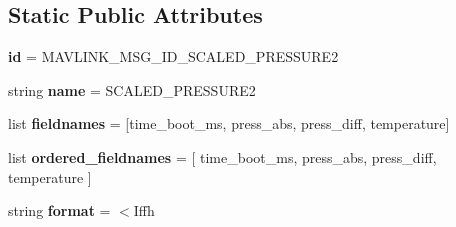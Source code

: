 \subsection*{Static Public Attributes}
\begin{DoxyCompactItemize}
\item 
\mbox{\label{classpymavlink_1_1dialects_1_1v10_1_1MAVLink__scaled__pressure2__message_ac66d91ca3622bdeb282b62afc1de1c6a}} 
{\bfseries id} = M\+A\+V\+L\+I\+N\+K\+\_\+\+M\+S\+G\+\_\+\+I\+D\+\_\+\+S\+C\+A\+L\+E\+D\+\_\+\+P\+R\+E\+S\+S\+U\+R\+E2
\item 
\mbox{\label{classpymavlink_1_1dialects_1_1v10_1_1MAVLink__scaled__pressure2__message_ad426768002b2568831a07eaeb1a36ba4}} 
string {\bfseries name} = \textquotesingle{}S\+C\+A\+L\+E\+D\+\_\+\+P\+R\+E\+S\+S\+U\+R\+E2\textquotesingle{}
\item 
\mbox{\label{classpymavlink_1_1dialects_1_1v10_1_1MAVLink__scaled__pressure2__message_a4ec01c67351e0902a546a796f3b4b1c2}} 
list {\bfseries fieldnames} = \mbox{[}\textquotesingle{}time\+\_\+boot\+\_\+ms\textquotesingle{}, \textquotesingle{}press\+\_\+abs\textquotesingle{}, \textquotesingle{}press\+\_\+diff\textquotesingle{}, \textquotesingle{}temperature\textquotesingle{}\mbox{]}
\item 
\mbox{\label{classpymavlink_1_1dialects_1_1v10_1_1MAVLink__scaled__pressure2__message_a3de88790bff3d565933d9c56fc82ffd2}} 
list {\bfseries ordered\+\_\+fieldnames} = \mbox{[} \textquotesingle{}time\+\_\+boot\+\_\+ms\textquotesingle{}, \textquotesingle{}press\+\_\+abs\textquotesingle{}, \textquotesingle{}press\+\_\+diff\textquotesingle{}, \textquotesingle{}temperature\textquotesingle{} \mbox{]}
\item 
\mbox{\label{classpymavlink_1_1dialects_1_1v10_1_1MAVLink__scaled__pressure2__message_a4602830c5f318293a236cde368227c0c}} 
string {\bfseries format} = \textquotesingle{}$<$Iffh\textquotesingle{}
\item 
\mbox{\label{classpymavlink_1_1dialects_1_1v10_1_1MAVLink__scaled__pressure2__message_a97cd9d0fe3cc7ad997de99c71b6435b7}} 

\end{DoxyCompactItemize}
